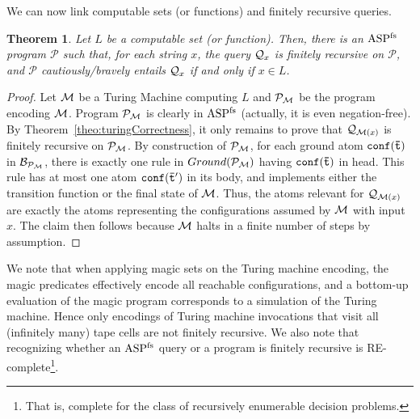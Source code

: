 \documentclass{tlp}
\newcommand{\nop}[1]{}
\newcommand{\p}{\ensuremath{{\mathcal{P}}}}
\newcommand{\q}{\ensuremath{{\cal Q}}}
\newcommand{\ground}[1]{\ensuremath{Ground(#1)}}
\newtheorem{theorem}{Theorem}[section]
\newtheorem{corollary}[theorem]{Corollary}
\renewcommand{\P}{\mathcal{P}}
\renewcommand{\t}{\bar t}
\newcommand{\ASPFN}{\ensuremath{\rm ASP^{\rm fs}}}
\begin{document}
We can now link computable sets (or functions) and finitely recursive queries.

\begin{theorem}\label{theo:turingFinRecQ}
Let $L$ be a computable set (or function).
Then, there is an \ASPFN{} program $\p$ such that, for each string $x$,
the query $\q_x$ is finitely recursive on $\p$,
and $\p$ cautiously/bravely entails $\q_x$ if and only if $x \in L$.
\end{theorem}
\begin{proof}
Let ${\cal M}$ be a Turing Machine computing $L$ and $\p_{\cal M}$ be the
program encoding $\cal M$. Program $\p_{\cal M}$ is clearly in
\ASPFN{} (actually, it is even negation-free).
By Theorem~\ref{theo:turingCorrectness}, it only remains to prove that 
$\q_{{\cal M}(x)}$ is finitely recursive on $\p_{\cal M}$.
By construction of $\p_{\cal M}$, for each ground atom 
$\tt conf(\t)$ in ${\cal B}_{\P_{\cal M}}$,
there is exactly one rule in $\ground{\p_{\cal M}}$ having $\tt conf(\t)$
in head.
This rule has at most one atom $\tt conf(\t')$ in its body, and
implements either the transition function or the final state of $\cal M$.
Thus, the atoms relevant for $\q_{{\cal M}(x)}$ are exactly the atoms
representing the configurations assumed by $\cal M$ with input $x$.
The claim then follows because $\cal M$ halts in a finite number of steps
by assumption.
\end{proof}

We note that when applying magic sets on the Turing machine encoding,
the magic predicates effectively encode all reachable configurations,
and a bottom-up evaluation of the magic program corresponds to a
simulation of the Turing machine. Hence only
encodings of Turing machine invocations that visit all (infinitely
many) tape cells are not finitely recursive. We also note
that recognizing whether an \ASPFN{} query or a program is finitely
recursive is RE-complete\footnote{That is, complete for the class of recursively enumerable decision problems.}.

\nop{
Finally, by combining Theorem~\ref{theo:turingFinRecQ} and 
Theorem~\ref{theo:decidability} 
with the R.E-completeness of the 
halting problem, we obtain the next theorem.

\begin{corollary}\label{cor:REcomplete}
The following problems are R.E.-complete:
$(i)$ recognizing whether a program $\p$ is finitely recursive;
$(ii)$ recognizing whether a query $\q$ is finitely recursive on a program $\p$.
\end{corollary}
}
\end{document}
